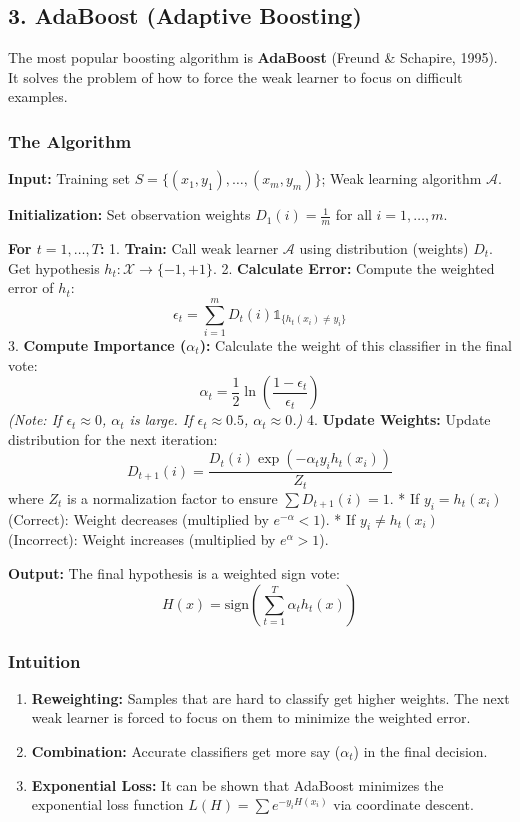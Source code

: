 \documentclass[
  italian,
  11pt,
]{article}
\providecommand{\tightlist}{%
  \setlength{\itemsep}{0pt}\setlength{\parskip}{0pt}}
\begin{document}
\subsection{3. AdaBoost (Adaptive
Boosting)}\label{adaboost-adaptive-boosting}

The most popular boosting algorithm is \textbf{AdaBoost} (Freund \&
Schapire, 1995). It solves the problem of how to force the weak learner
to focus on difficult examples.

\subsubsection{The Algorithm}\label{the-algorithm}

\textbf{Input:} Training set \(S = \{(x_1, y_1), \dots, (x_m, y_m)\}\);
Weak learning algorithm \(\mathcal{A}\).

\textbf{Initialization:} Set observation weights
\(D_1(i) = \frac{1}{m}\) for all \(i=1, \dots, m\).

\textbf{For \(t = 1, \dots, T\):} 1. \textbf{Train:} Call weak learner
\(\mathcal{A}\) using distribution (weights) \(D_t\). Get hypothesis
\(h_t: \mathcal{X} \to \{-1, +1\}\). 2. \textbf{Calculate Error:}
Compute the weighted error of \(h_t\):
\[ \epsilon_t = \sum_{i=1}^{m} D_t(i) \mathbb{1}_{\{h_t(x_i) \neq y_i\}} \]
3. \textbf{Compute Importance (\(\alpha_t\)):} Calculate the weight of
this classifier in the final vote:
\[ \alpha_t = \frac{1}{2} \ln \left( \frac{1 - \epsilon_t}{\epsilon_t} \right) \]
\emph{(Note: If \(\epsilon_t \approx 0\), \(\alpha_t\) is large. If
\(\epsilon_t \approx 0.5\), \(\alpha_t \approx 0\).)} 4. \textbf{Update
Weights:} Update distribution for the next iteration:
\[ D_{t+1}(i) = \frac{D_t(i) \exp(-\alpha_t y_i h_t(x_i))}{Z_t} \] where
\(Z_t\) is a normalization factor to ensure \(\sum D_{t+1}(i) = 1\). *
If \(y_i = h_t(x_i)\) (Correct): Weight decreases (multiplied by
\(e^{-\alpha} < 1\)). * If \(y_i \neq h_t(x_i)\) (Incorrect): Weight
increases (multiplied by \(e^{\alpha} > 1\)).

\textbf{Output:} The final hypothesis is a weighted sign vote:
\[ H(x) = \text{sign} \left( \sum_{t=1}^{T} \alpha_t h_t(x) \right) \]

\subsubsection{Intuition}\label{intuition}

\begin{enumerate}
\def\labelenumi{\arabic{enumi}.}
\tightlist
\item
  \textbf{Reweighting:} Samples that are hard to classify get higher
  weights. The next weak learner is forced to focus on them to minimize
  the weighted error.
\item
  \textbf{Combination:} Accurate classifiers get more say (\(\alpha_t\))
  in the final decision.
\item
  \textbf{Exponential Loss:} It can be shown that AdaBoost minimizes the
  exponential loss function \(L(H) = \sum e^{-y_i H(x_i)}\) via
  coordinate descent.
\end{enumerate}
\end{document}
